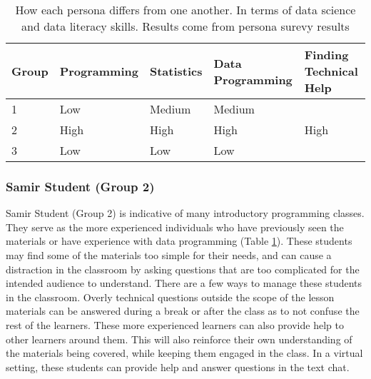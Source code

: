 \documentclass[020-persona\_validation.tex]{subfiles}
\begin{document}
        \begin{table}[htb]
            \centering
            \caption[Persona Data Science Skill Rating]
            {How each persona differs from one another. In terms of data science and data literacy skills.
             Results come from persona surevy results
            }
            \begin{tabular}{lllll}
            \hline
            Group & Programming & Statistics & Data Programming & Finding Technical Help \\
            \hline
            1     & Low         & Medium     & Medium           &                        \\
            2     & High        & High       & High             & High                   \\
            3     & Low         & Low        & Low              &                        \\
            \hline
            \end{tabular}
            \label{tab:persona-summary-table}
        \end{table}

        \subsubsection{Samir Student (Group 2)}

            Samir Student (Group 2) is indicative of many introductory programming classes.
            They serve as the more experienced individuals who have previously seen the materials
            or have experience with data programming (Table \ref{tab:persona-summary-table}).
            These students may find some of the materials too simple for their needs,
            and can cause a distraction in the classroom by asking questions that are too complicated
            for the intended audience to understand.
            There are a few ways to manage these students in the classroom.
            Overly technical questions outside the scope of the lesson materials
            can be answered during a break or after the class as to not confuse the rest of the learners.
            These more experienced learners can also provide help to other learners around them.
            This will also reinforce their own understanding of the materials being covered,
            while keeping them engaged in the class.
            In a virtual setting,
            these students can provide help and answer questions in the text chat.
\end{document}
